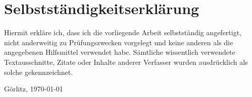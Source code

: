 \section*{Selbstständigkeitserklärung}
\thispagestyle{empty} Hiermit erkläre ich, dass ich die vorliegende
Arbeit selbstständig angefertigt, nicht anderweitig zu
Prüfungszwecken vorgelegt und keine anderen als die angegebenen
Hilfsmittel verwendet habe. Sämtliche wissentlich verwendete
Textausschnitte, Zitate oder Inhalte anderer Verfasser
wurden ausdrücklich als solche gekennzeichnet.%




Görlitz, \today